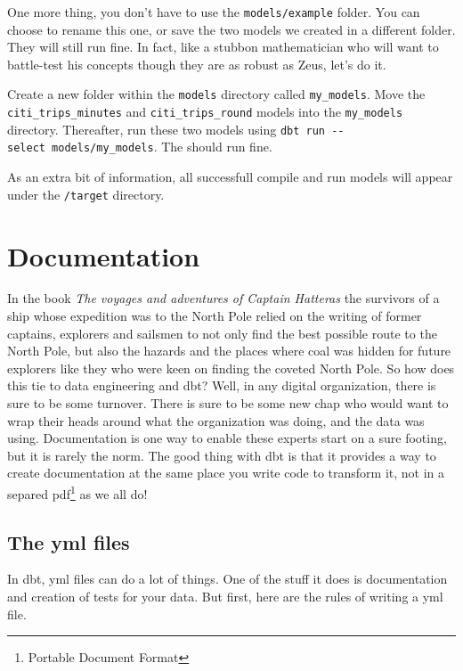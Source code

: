 \documentclass[
]{book}
\begin{document}
One more thing, you don't have to use the \texttt{models/example} folder. You can choose to rename this one, or save the two models we created in a different folder. They will still run fine. In fact, like a stubbon mathematician who will want to battle-test his concepts though they are as robust as Zeus, let's do it.

Create a new folder within the \texttt{models} directory called \texttt{my\_models}. Move the \texttt{citi\_trips\_minutes} and \texttt{citi\_trips\_round} models into the \texttt{my\_models} directory. Thereafter, run these two models using \texttt{dbt\ run\ -\/-select\ models/my\_models}. The should run fine.

As an extra bit of information, all successfull compile and run models will appear under the \texttt{/target} directory.

\hypertarget{documentation-1}{%
\chapter{Documentation}\label{documentation-1}}

In the book \emph{The voyages and adventures of Captain Hatteras} the survivors of a ship whose expedition was to the North Pole relied on the writing of former captains, explorers and sailsmen to not only find the best possible route to the North Pole, but also the hazards and the places where coal was hidden for future explorers like they who were keen on finding the coveted North Pole. So how does this tie to data engineering and dbt? Well, in any digital organization, there is sure to be some turnover. There is sure to be some new chap who would want to wrap their heads around what the organization was doing, and the data was using. Documentation is one way to enable these experts start on a sure footing, but it is rarely the norm. The good thing with dbt is that it provides a way to create documentation at the same place you write code to transform it, not in a separed pdf\footnote{Portable Document Format} as we all do!

\hypertarget{the-yml-files}{%
\section{The yml files}\label{the-yml-files}}

In dbt, yml files can do a lot of things. One of the stuff it does is documentation and creation of tests for your data. But first, here are the rules of writing a yml file.
\end{document}
